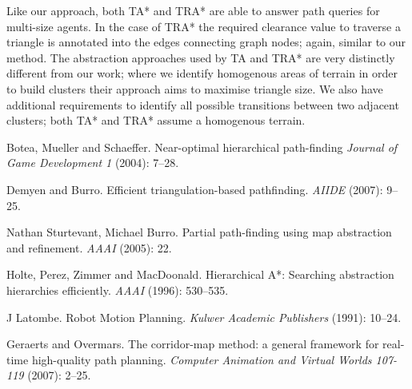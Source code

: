 \documentclass[a4paper]{article}
\begin{document}
Like our approach, both TA* and TRA* are able to answer path queries for multi-size agents. In the case of TRA* the required clearance value to traverse a triangle is annotated into the edges connecting graph nodes; again, similar to our method. The abstraction approaches used by TA and TRA* are very distinctly different from our work; where we identify homogenous areas of terrain in order to build clusters their approach aims to maximise triangle size. We also have additional requirements to identify all possible transitions between two adjacent clusters; both TA* and TRA* assume a homogenous terrain.


\begin{thebibliography}{99}

Botea, Mueller and Schaeffer.
Near-optimal hierarchical path-finding
\emph{Journal of Game Development 1} (2004): 7--28.

  Demyen and Burro.
  Efficient triangulation-based pathfinding.
  \emph{AIIDE} (2007): 9--25.

  Nathan Sturtevant, Michael Burro.
  Partial path-finding using map abstraction and refinement. 
  \emph{AAAI} (2005): 22.

  Holte, Perez, Zimmer and MacDoonald.
  Hierarchical A*: Searching abstraction hierarchies efficiently.
  \emph{AAAI} (1996): 530--535.

  J Latombe.
  Robot Motion Planning.
  \emph{Kulwer Academic Publishers} (1991): 10--24.

  Geraerts and Overmars.
  The corridor-map method: a general framework for real-time high-quality path planning.
  \emph{Computer Animation and Virtual Worlds 107-119} (2007): 2--25.

\end{thebibliography}
\end{document}
